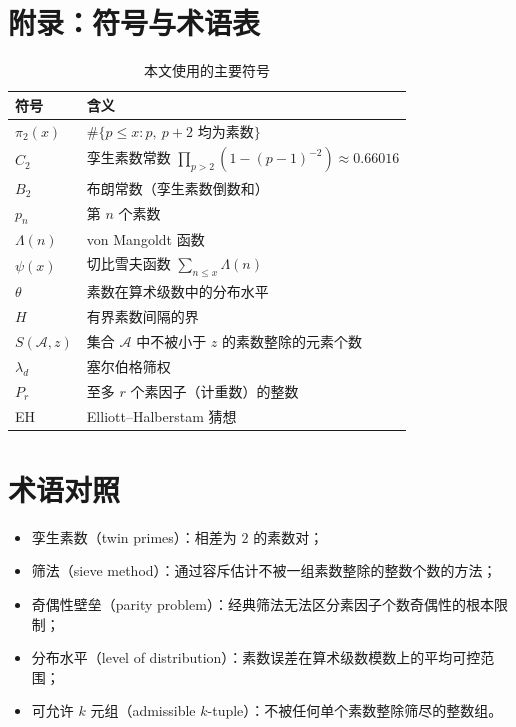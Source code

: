 \section{附录：符号与术语表}\label{sec:appendix}

\begin{table}[htbp]
    \centering
    \caption{本文使用的主要符号}
    \label{tab:notation}
    \begin{tabular}{ll}
        \toprule
        符号 & 含义 \\
        \midrule
        $\pi_2(x)$ & $\#\{p \le x : p,\ p+2 \text{ 均为素数}\}$ \\
        $C_2$ & 孪生素数常数 $\prod_{p>2}(1 - (p-1)^{-2}) \approx 0.66016$ \\
        $B_2$ & 布朗常数（孪生素数倒数和） \\
        $p_n$ & 第 $n$ 个素数 \\
        $\Lambda(n)$ & von Mangoldt 函数 \\
        $\psi(x)$ & 切比雪夫函数 $\sum_{n \le x} \Lambda(n)$ \\
        $\theta$ & 素数在算术级数中的分布水平 \\
        $H$ & 有界素数间隔的界 \\
        $S(\mathcal{A}, z)$ & 集合 $\mathcal{A}$ 中不被小于 $z$ 的素数整除的元素个数 \\
        $\lambda_d$ & 塞尔伯格筛权 \\
        $P_r$ & 至多 $r$ 个素因子（计重数）的整数 \\
        EH & Elliott--Halberstam 猜想 \\
        \bottomrule
    \end{tabular}
\end{table}

\section*{术语对照}
\begin{itemize}
    \item 孪生素数（twin primes）：相差为 $2$ 的素数对；
    \item 筛法（sieve method）：通过容斥估计不被一组素数整除的整数个数的方法；
    \item 奇偶性壁垒（parity problem）：经典筛法无法区分素因子个数奇偶性的根本限制；
    \item 分布水平（level of distribution）：素数误差在算术级数模数上的平均可控范围；
    \item 可允许 $k$ 元组（admissible $k$-tuple）：不被任何单个素数整除筛尽的整数组。
\end{itemize}

